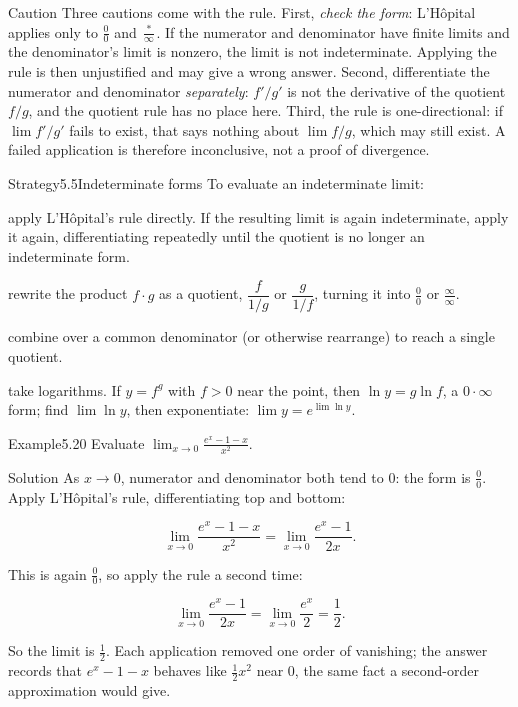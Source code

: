 \documentclass[a4paper,12pt,oneside]{memoir}
\begin{document}
\begin{envcaution}{Caution}{}{}
Three cautions come with the rule. First, \emph{check the form}: L’Hôpital applies only to \(\tfrac{0}{0}\) and \(\tfrac{\ast}{\infty}\). If the numerator and denominator have finite limits and the denominator’s limit is nonzero, the limit is not indeterminate. Applying the rule is then unjustified and may give a wrong answer. Second, differentiate the numerator and denominator \emph{separately}: \(f'\!/g'\) is not the derivative of the quotient \(f/g\), and the quotient rule has no place here. Third, the rule is one-directional: if \(\lim f'\!/g'\) fails to exist, that says nothing about \(\lim f/g\), which may still exist. A failed application is therefore inconclusive, not a proof of divergence.
\end{envcaution}
\begin{envstrategy}{Strategy}{5.5}{Indeterminate forms}
To evaluate an indeterminate limit:

\begin{steps}
  \item {} apply L’Hôpital’s rule directly. If the resulting limit is again indeterminate, apply it again, differentiating repeatedly until the quotient is no longer an indeterminate form.
  \item \runin{\(0 \cdot \infty\):} rewrite the product \(f\cdot g\) as a quotient, \(\dfrac{f}{1/g}\) or \(\dfrac{g}{1/f}\), turning it into \(\tfrac{0}{0}\) or \(\tfrac{\infty}{\infty}\).
  \item \runin{\(\infty - \infty\):} combine over a common denominator (or otherwise rearrange) to reach a single quotient.
  \item {} take logarithms. If \(y = f^{g}\) with \(f > 0\) near the point, then \(\ln y = g\ln f\), a \(0 \cdot \infty\) form; find \(\lim \ln y\), then exponentiate: \(\lim y = e^{\lim \ln y}\).
\end{steps}
\end{envstrategy}
\begin{workedexample}
\begin{envexample}{Example}{5.20}{}
Evaluate \(\displaystyle \lim_{x \to 0} \frac{e^{x} - 1 - x}{x^{2}}\).
\end{envexample}
\begin{envsolution}{Solution}{}{}
As \(x \to 0\), numerator and denominator both tend to \(0\): the form is \(\tfrac{0}{0}\). Apply L’Hôpital’s rule, differentiating top and bottom:

\[ \lim_{x \to 0} \frac{e^{x} - 1 - x}{x^{2}} = \lim_{x \to 0} \frac{e^{x} - 1}{2x}. \]

This is again \(\tfrac{0}{0}\), so apply the rule a second time:

\[ \lim_{x \to 0} \frac{e^{x} - 1}{2x} = \lim_{x \to 0} \frac{e^{x}}{2} = \frac{1}{2}. \]

So the limit is \(\tfrac{1}{2}\). Each application removed one order of vanishing; the answer records that \(e^{x} - 1 - x\) behaves like \(\tfrac{1}{2}x^{2}\) near \(0\), the same fact a second-order approximation would give. \qedmark
\end{envsolution}
\end{workedexample}
\end{document}
